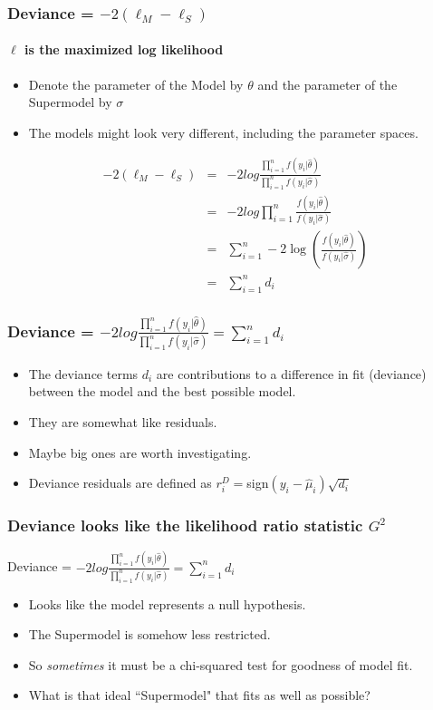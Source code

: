 \documentclass[serif]{beamer} %
\begin{document}
\begin{frame} %
\frametitle{Deviance = $-2(\ell_M-\ell_S)$}
\framesubtitle{$\ell$ is the maximized log likelihood} 
\begin{itemize}
     \item Denote the parameter of the Model by $\theta$ and the parameter of the Supermodel by $\sigma$
     \item The models might look very different, including the parameter spaces.
\end{itemize}

\begin{eqnarray*}
    -2(\ell_M-\ell_S) & = & -2log\frac{ \prod_{i=1}^n f(y_i|\widehat{\theta}) }
                                { \prod_{i=1}^n f(y_i|\widehat{\sigma}) }\\
 & = &  -2log \prod_{i=1}^n \frac{f(y_i|\widehat{\theta})}
                                 {f(y_i|\widehat{\sigma})} \\
 & = & \sum_{i=1}^n -2\log \left(\frac{f(y_i|\widehat{\theta})}
                                 {f(y_i|\widehat{\sigma})} \right) \\
 & = & \sum_{i=1}^n d_i
\end{eqnarray*} 
\end{frame}

\begin{frame}
\frametitle{Deviance = $-2log\frac{ \prod_{i=1}^n f(y_i|\widehat{\theta}) }
                                { \prod_{i=1}^n f(y_i|\widehat{\sigma}) }
                     = \sum_{i=1}^n d_i$}
  \begin{itemize}
    \item The deviance terms $d_i$ are contributions to a difference in fit (deviance) between the model and the best possible model.
    \item They are somewhat like residuals.
    \item Maybe big ones are worth investigating.
    \item Deviance residuals are defined as $r^D_i = $sign$(y_i-\widehat{\mu}_i)\sqrt{d_i}$
  \end{itemize}
\end{frame}

\begin{frame}
\frametitle{Deviance looks like the likelihood ratio statistic $G^2$}
Deviance = $-2log\frac{ \prod_{i=1}^n f(y_i|\widehat{\theta}) }
                                { \prod_{i=1}^n f(y_i|\widehat{\sigma}) }
                     = \sum_{i=1}^n d_i$
  \begin{itemize}
    \item Looks like the model represents a null hypothesis.
    \item The Supermodel is somehow less restricted.
    \item So \emph{sometimes} it must be a chi-squared test for goodness of model fit.
    \item What is that ideal ``Supermodel" that fits as well as possible?
  \end{itemize}
\end{frame}
\end{document}
